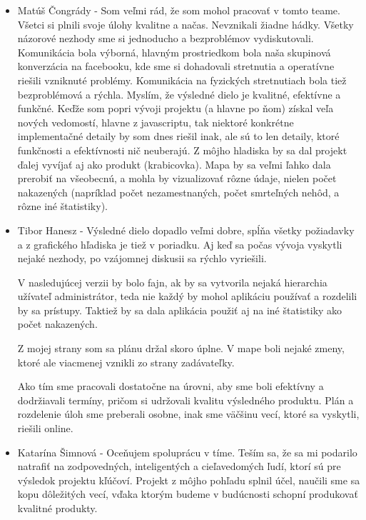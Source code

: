 \documentclass[12pt,a4paper]{report}
\begin{document}
\begin{itemize}
	\item Matúš Čongrády - Som veľmi rád, že som mohol pracovať v tomto teame. Všetci si plnili svoje úlohy kvalitne a načas. Nevznikali žiadne hádky. Všetky názorové nezhody sme si jednoducho a bezproblémov vydiskutovali. Komunikácia bola výborná, hlavným prostriedkom bola naša skupinová konverzácia na facebooku, kde sme si dohadovali stretnutia a operatívne riešili vzniknuté problémy. Komunikácia na fyzických stretnutiach bola tiež bezproblémová a rýchla. Myslím, že výsledné dielo je kvalitné, efektívne a funkčné. Keďže som popri vývoji projektu (a hlavne po ňom) získal veľa nových vedomostí, hlavne z javascriptu, tak niektoré konkrétne implementačné detaily by som dnes riešil inak, ale sú to len detaily, ktoré funkčnosti a efektívnosti nič neuberajú. Z môjho hladiska by sa dal projekt ďalej vyvíjať aj ako produkt (krabicovka). Mapa by sa veľmi ľahko dala prerobiť na všeobecnú, a mohla by vizualizovať rôzne údaje, nielen počet nakazených (napríklad počet nezamestnaných, počet smrteľných nehôd, a rôzne iné štatistiky).
	\item Tibor Hanesz - Výsledné dielo dopadlo veľmi dobre, spĺňa všetky požiadavky a z grafického hľadiska je tiež v poriadku. Aj keď sa počas vývoja vyskytli nejaké nezhody, po vzájomnej diskusii sa rýchlo vyriešili.\par
	V nasledujúcej verzii by bolo fajn, ak by sa vytvorila nejaká hierarchia užívateľ administrátor, teda nie každý by mohol aplikáciu používať a rozdelili by sa prístupy. Taktiež by sa dala aplikácia použiť aj na iné štatistiky ako počet nakazených.\par
	Z mojej strany som sa plánu držal skoro úplne. V mape boli nejaké zmeny, ktoré ale viacmenej vznikli zo strany zadávateľky.\par
	Ako tím sme pracovali dostatočne na úrovni, aby sme boli efektívny a dodržiavali termíny, pričom si udržovali kvalitu výsledného produktu. Plán a rozdelenie úloh sme preberali osobne, inak sme väčšinu vecí, ktoré sa vyskytli, riešili online.
	\item Katarína Šimnová - Oceňujem spoluprácu v tíme. Teším sa, že sa mi podarilo natrafiť na zodpovedných, inteligentých a cieľavedomých ľudí, ktorí sú pre výsledok projektu kľúčoví. Projekt z môjho pohľadu splnil účel, naučili sme sa kopu dôležitých vecí, vďaka ktorým budeme v budúcnosti schopní produkovať kvalitné produkty.
\end{itemize}
\end{document}
